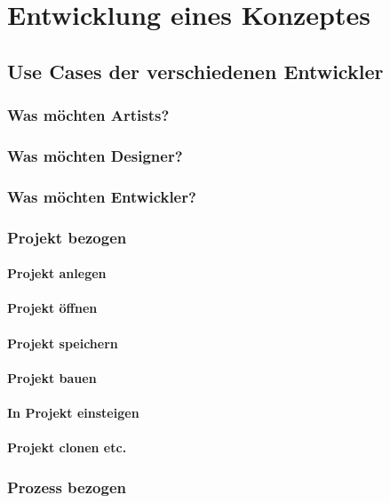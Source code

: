 \documentclass[pagesize, paper=a4, fontsize=12pt,titlepage=true, headings=small, headnosepline, abstractoff, liststotoc, nochapterprefix, plainheadsepline, twoside]{scrreprt}
\begin{document}
\chapter{Entwicklung eines Konzeptes}

\section{Use Cases der verschiedenen Entwickler}
\subsection{Was möchten Artists?}
\subsection{Was möchten Designer?}
\subsection{Was möchten Entwickler?}

\subsection{Projekt bezogen}
\subsubsection{Projekt anlegen}
\subsubsection{Projekt öffnen}
\subsubsection{Projekt speichern}
\subsubsection{Projekt bauen}
\subsubsection{In Projekt einsteigen}
\subsubsection{Projekt clonen etc.}

\subsection{Prozess bezogen}
\end{document}
